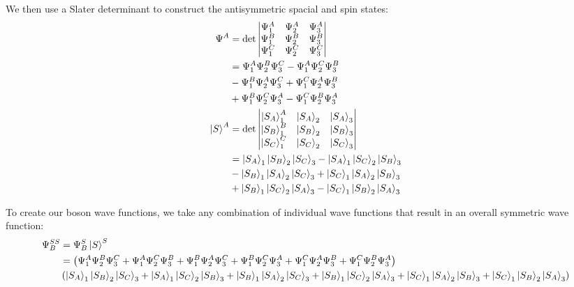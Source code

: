 \documentclass[10pt]{article} %
\begin{document}
We then use a Slater determinant to construct the antisymmetric spacial and spin states:\\

\begin{align*}
  \Psi^{A} &= \det
  \begin{vmatrix}
    \Psi_1^A & \Psi_2^A & \Psi_3^A\\
    \Psi_1^B & \Psi_2^B & \Psi_3^B\\
    \Psi_1^C & \Psi_2^C & \Psi_3^C\\
  \end{vmatrix}\\
  &= \Psi_1^A\Psi_2^B\Psi_3^C - \Psi_1^A\Psi_2^C\Psi_3^B\\
  &- \Psi_1^B\Psi_2^A\Psi_3^C + \Psi_1^C\Psi_2^A\Psi_3^B\\
  &+ \Psi_1^B\Psi_2^C\Psi_3^A - \Psi_1^C\Psi_2^B\Psi_3^A\\
  \ket{S}^A &= \det
  \begin{vmatrix}
    \ket{S_A}_1^A & \ket{S_A}_2 & \ket{S_A}_3\\
    \ket{S_B}_1^B & \ket{S_B}_2 & \ket{S_B}_3\\
    \ket{S_C}_1^C & \ket{S_C}_2 & \ket{S_C}_3\\
  \end{vmatrix}\\
  &= \ket{S_A}_1\ket{S_B}_2\ket{S_C}_3 - \ket{S_A}_1\ket{S_C}_2\ket{S_B}_3\\
  &- \ket{S_B}_1\ket{S_A}_2\ket{S_C}_3 + \ket{S_C}_1\ket{S_A}_2\ket{S_B}_3\\
  &+ \ket{S_B}_1\ket{S_C}_2\ket{S_A}_3 - \ket{S_C}_1\ket{S_B}_2\ket{S_A}_3\\
\end{align*}

To create our boson wave functions, we take any combination of individual wave functions that result
in an overall symmetric wave function:\\

\begin{align*}
  \Psi_B^{SS} &= \Psi_B^S\ket{S}^S\\
  &= \left(\Psi_1^A\Psi_2^B\Psi_3^C + \Psi_1^A\Psi_2^C\Psi_3^B
  + \Psi_1^B\Psi_2^A\Psi_3^C + \Psi_1^B\Psi_2^C\Psi_3^A
  + \Psi_1^C\Psi_2^A\Psi_3^B + \Psi_1^C\Psi_2^B\Psi_3^A\right)\\
  &\left(\ket{S_A}_1\ket{S_B}_2\ket{S_C}_3 + \ket{S_A}_1\ket{S_C}_2\ket{S_B}_3
  + \ket{S_B}_1\ket{S_A}_2\ket{S_C}_3 + \ket{S_B}_1\ket{S_C}_2\ket{S_A}_3
  + \ket{S_C}_1\ket{S_A}_2\ket{S_B}_3 + \ket{S_C}_1\ket{S_B}_2\ket{S_A}_3\right)
\end{align*}
\end{document}
